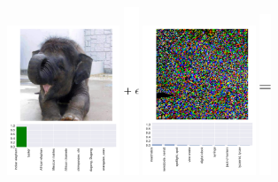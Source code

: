 \begin{figure}
     \centering
     \includegraphics[width=0.30\textwidth,angle=0]{figures/protect/ori.pdf}
     \includegraphics[width=0.04\textwidth,angle=0,scale=0.9]{figures/protect/plus_epsilon.png}
     \includegraphics[width=0.30\textwidth,angle=0]{figures/protect/noise.pdf}
     \includegraphics[width=0.03\textwidth,angle=0,scale=0.9]{figures/protect/equals.png}

\end{figure}

